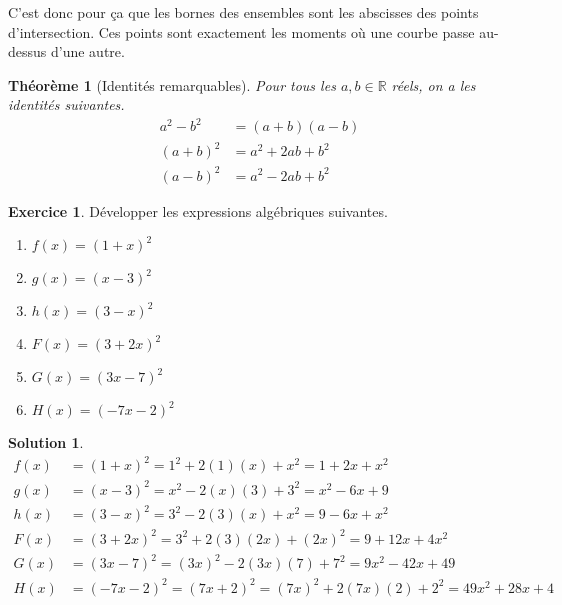 \documentclass[a4paper, 14pt]{extarticle}
\theoremstyle{plain}
\newtheorem*{theorem*}{Th\'eor\`eme}
\newtheorem*{sol}{Solution}
\theoremstyle{definition}
\newtheorem{ex}{Exercice}
\newcommand{\R}{\mathbb{R}}
\newcommand{\exe}[2]{
		\begin{ex} #1  \end{ex}
		\begin{sol} #2 \end{sol}
	}
\newcommand{\exe}[2]{
		\begin{ex} #1  \end{ex}
	}
\begin{document}
{		C'est donc pour ça que les bornes des ensembles sont les abscisses des points d'intersection.
		Ces points sont exactement les moments où une courbe passe au-dessus d'une autre.
	}
	
	
	\begin{theorem*}[Identités remarquables]
		Pour tous les $a,b\in\R$ réels, on a les identités suivantes.
			\begin{align*}
				a^2 - b^2 &= (a+b)(a-b) \\
				(a+b)^2 &= a^2 + 2ab + b^2 \\
				(a-b)^2 &= a^2 - 2ab + b^2
			\end{align*}
	\end{theorem*}


	\exe{
		Développer les expressions algébriques suivantes.
			\begin{multicols}{2}
			\begin{enumerate}[$\bullet$]
				\item $f(x) = (1+x)^2$
				\item $g(x) = (x-3)^2$
				\item $h(x) = (3-x)^2$
				\item $F(x) = (3 + 2x)^2$
				\item $G(x) = (3x - 7)^2$
				\item $H(x) = (-7x - 2)^2$
			\end{enumerate}
			\end{multicols}
	}{
	
	
	\begin{align*}
		f(x) &= (1+x)^2 = 1^2 + 2(1)(x) + x^2 = 1 + 2x + x^2 \\
		g(x) &= (x-3)^2 = x^2 - 2(x)(3) + 3^2 = x^2 - 6x + 9 \\
		h(x) &= (3-x)^2 = 3^2 - 2(3)(x) + x^2 = 9 - 6x + x^2 \\
		F(x) &= (3 + 2x)^2 = 3^2 + 2(3)(2x) + (2x)^2 = 9 + 12x + 4x^2 \\
		G(x) &= (3x - 7)^2 = (3x)^2 - 2(3x)(7) + 7^2 = 9x^2 - 42x + 49 \\
		H(x) &= (-7x - 2)^2 = (7x + 2)^2 = (7x)^2 + 2(7x)(2) + 2^2 = 49x^2 + 28x + 4
	\end{align*}
	
	
	
	}
	
\end{document}
